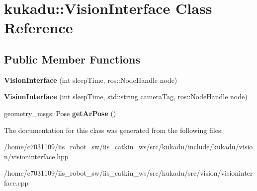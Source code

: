 \hypertarget{classkukadu_1_1VisionInterface}{\section{kukadu\-:\-:Vision\-Interface Class Reference}
\label{classkukadu_1_1VisionInterface}
}
\subsection*{Public Member Functions}
\begin{DoxyCompactItemize}
\item 
\hypertarget{classkukadu_1_1VisionInterface_ac4e5f07e43562dcf962c6dfa46d69076}{{\bfseries Vision\-Interface} (int sleep\-Time, ros\-::\-Node\-Handle node)}\label{classkukadu_1_1VisionInterface_ac4e5f07e43562dcf962c6dfa46d69076}

\item 
\hypertarget{classkukadu_1_1VisionInterface_a1c70bb5c9c38bc7a993deb659285b4b6}{{\bfseries Vision\-Interface} (int sleep\-Time, std\-::string camera\-Tag, ros\-::\-Node\-Handle node)}\label{classkukadu_1_1VisionInterface_a1c70bb5c9c38bc7a993deb659285b4b6}

\item 
\hypertarget{classkukadu_1_1VisionInterface_ad2b2995f0e069a0986e041a9becc9b53}{geometry\-\_\-msgs\-::\-Pose {\bfseries get\-Ar\-Pose} ()}\label{classkukadu_1_1VisionInterface_ad2b2995f0e069a0986e041a9becc9b53}

\end{DoxyCompactItemize}


The documentation for this class was generated from the following files\-:\begin{DoxyCompactItemize}
\item 
/home/c7031109/iis\-\_\-robot\-\_\-sw/iis\-\_\-catkin\-\_\-ws/src/kukadu/include/kukadu/vision/visioninterface.\-hpp\item 
/home/c7031109/iis\-\_\-robot\-\_\-sw/iis\-\_\-catkin\-\_\-ws/src/kukadu/src/vision/visioninterface.\-cpp\end{DoxyCompactItemize}
